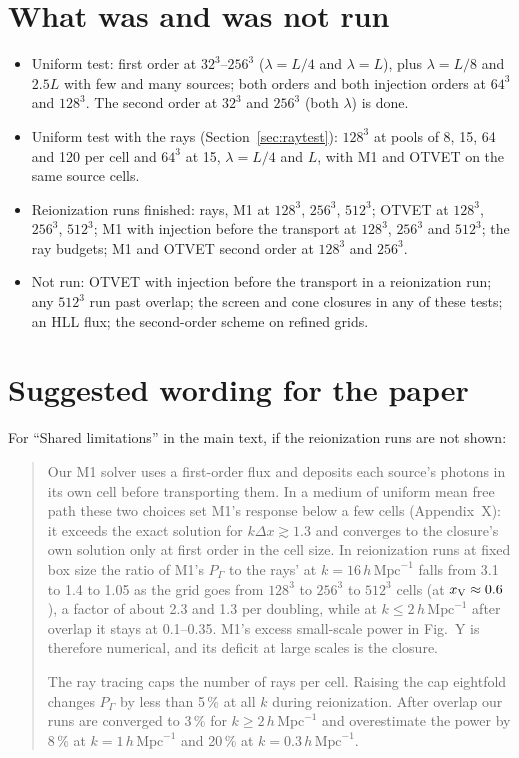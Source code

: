 \documentclass[11pt]{article}
\newcommand{\hmpc}{\,h\,\mathrm{Mpc}^{-1}}
\newcommand{\xv}{x_{\rm V}}
\newcommand{\dx}{\Delta x}
\begin{document}
\section{What was and was not run}\label{sec:status}

\begin{itemize}
\item Uniform test: first order at $32^3$--$256^3$ ($\lambda=L/4$ and $\lambda=L$), plus
$\lambda=L/8$ and $2.5L$ with few and many sources; both orders and both injection orders at $64^3$ and $128^3$.
The second order at $32^3$ and $256^3$ (both $\lambda$) is done.
\item Uniform test with the rays (Section~\ref{sec:raytest}): $128^3$ at pools of 8, 15, 64 and 120 per cell and
$64^3$ at 15, $\lambda=L/4$ and $L$, with M1 and OTVET on the same source cells.
\item Reionization runs finished: rays, M1 at $128^3$, $256^3$, $512^3$; OTVET at $128^3$, $256^3$, $512^3$; M1 with injection before the transport at $128^3$,
$256^3$ and $512^3$; the ray budgets; M1 and OTVET second order at $128^3$ and $256^3$.
\item Not run: OTVET with injection before the transport in a reionization
run; any $512^3$ run past overlap; the screen and cone closures in any of these tests; an HLL flux; the second-order scheme on refined grids.
\end{itemize}

\section{Suggested wording for the paper}

For ``Shared limitations'' in the main text, if the reionization runs are not shown:

\begin{quote}
Our M1 solver uses a first-order flux and deposits each source's photons in its own cell before
transporting them. In a medium of uniform mean free path these two choices set M1's response below a few cells
(Appendix~X): it exceeds the exact solution for $k\dx\gtrsim1.3$ and converges to the closure's own solution only
at first order in the cell size. In reionization runs at fixed box size the ratio of M1's $P_\Gamma$ to the rays'
at $k=16\hmpc$ falls from 3.1 to 1.4 to 1.05 as the grid goes from $128^3$ to $256^3$ to $512^3$ cells
(at $\xv\approx0.6$), a factor of about 2.3 and 1.3 per doubling, while at $k\le2\hmpc$ after overlap it stays at 0.1--0.35.
M1's excess small-scale power in Fig.~Y is therefore numerical, and its deficit at large scales is the closure.

The ray tracing caps the number of rays per cell. Raising the cap eightfold changes $P_\Gamma$ by less than 5\,\%
at all $k$ during reionization. After overlap our runs are converged to 3\,\% for $k\ge2\hmpc$ and overestimate the
power by 8\,\% at $k=1\hmpc$ and 20\,\% at $k=0.3\hmpc$.
\end{quote}



\end{document}
